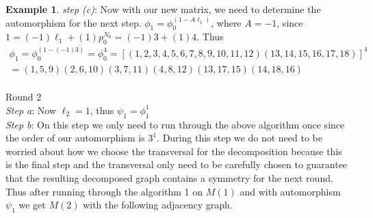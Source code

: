 \documentclass[preprint,12pt]{elsarticle}
\theoremstyle{definition}
\newtheorem{example}[thm]{Example}
\theoremstyle{remark}
\renewcommand{\emph}{\textit}
\begin{document}
\begin{example}
\emph{step (c)}: Now with our new matrix, we need to determine the automorphism for the next step.
$\phi_{1}=\phi_0^{(1-A\ell_{1})}$, where $A=-1$, since $1=(-1)\ell_{1}+(1)p_0^{N_0}=(-1)3+(1)4$.  Thus \begin{align*}
\phi_{1}=\phi_0^{(1-(-1)3)}=\phi_0^4=[(1,2,3,4,5,6,7,8,9,10,11,12)(13,14,15,16,17,18)]^4\\
=(1,5,9)(2,6,10)(3,7,11)(4,8,12)(13,17,15)(14,18,16)
\end{align*}
\\
Round 2\\
\emph{Step a}: Now $\ell_2=1$, thus $\psi_1=\phi_1^1$\\

\noindent \emph{Step b}: On this step we only need to run through the above algorithm once since the order of our automorphism is $3^1$.  During this step we do not need to be worried about how we choose the transversal for the decomposition because this is the final step and the transversal only need to be carefully chosen to guarantee that the resulting decomposed graph contains a symmetry for the next round. Thus after running through the algorithm 1 on $M(1)$ and with automorphism $\psi_1$ we get $M(2)$ with the following adjacency graph.


\end{example}
\end{document}

